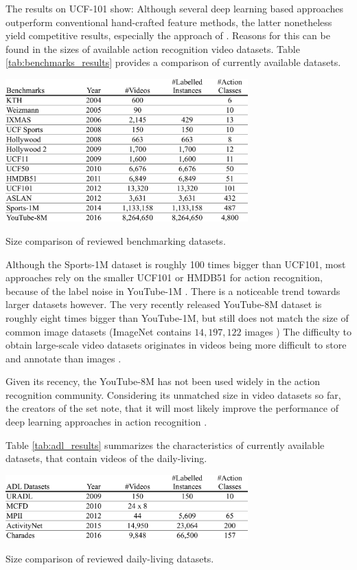 The results on UCF-101 show: Although several deep learning based approaches outperform conventional hand-crafted feature methods, the latter nonetheless yield competitive results, especially the approach of \textcite{lan_beyond_2015}.
Reasons for this can be found in the sizes of available action recognition video datasets.
Table \ref{tab:benchmarks_results} provides a comparison of currently available datasets.

\begin{table}[H]
    \centering
    \includegraphics[width=0.7\textwidth]{img_evaluation/benchmarks_results}
    \caption{Size comparison of reviewed benchmarking datasets.}
    \label{tab:benchmarks_results}
\end{table}

Although the Sports-1M dataset is roughly 100 times bigger than UCF101, most approaches rely on the smaller UCF101 or HMDB51 for action recognition, because of the label noise in YouTube-1M \cite{feichtenhofer_convolutional_2016}.
There is a noticeable trend towards larger datasets however.
The very recently released YouTube-8M dataset is roughly eight times bigger than YouTube-1M, but still does not match the size of common image datasets (ImageNet contains $14,197,122$ images \cite{_imagenet_????})
The difficulty to obtain large-scale video datasets originates in videos being more difficult to store and annotate than images \cite{karpathy_large-scale_2014}.

Given its recency, the YouTube-8M has not been used widely in the action recognition community.
Considering its unmatched size in video datasets so far, the creators of the set note, that it will most likely improve the performance of deep learning approaches in action recognition \cite{abu-el-haija_youtube-8m:_2016}.

Table \ref{tab:adl_results} summarizes the characteristics of currently available datasets, that contain videos of the daily-living.

\begin{table}[H]
    \centering
    \includegraphics[width=0.7\textwidth]{img_evaluation/adl_results}
    \caption{Size comparison of reviewed daily-living datasets.}
    \label{tab:adl_results}
\end{table}

